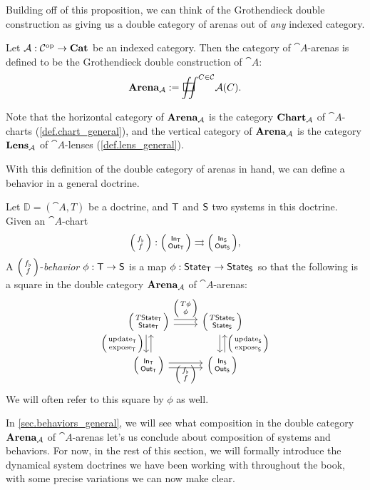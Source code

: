 \documentclass[DynamicalBook]{subfiles}
\begin{document}
Building off of this proposition, we can think of the Grothendieck double
construction as giving us a double category of arenas out of \emph{any} indexed
category.

\begin{definition}\label{def.double_cat_of_arenas_general}
  Let $\mathcal{A} : \mathcal{C}^{\textnormal{op}} \to \textbf{Cat}$ be an indexed category. Then the
  category of $\cat{A}$-arenas is defined to be the Grothendieck double
  construction of $\cat{A}$:
$$\Cat{Arena}_{\cat{A}} := \sqiint^{C \in \cat{C}} \cat{A}(C).$$

  Note that the horizontal category of $\textbf{Arena}_{\mathcal{A}}$ is the category
  $\textbf{Chart}_{\mathcal{A}}$ of $\cat{A}$-charts (\cref{def.chart_general}), and the vertical category of
  $\textbf{Arena}_{\mathcal{A}}$ is the category $\textbf{Lens}_{\mathcal{A}}$ of
  $\cat{A}$-lenses (\cref{def.lens_general}).
\end{definition}

With this definition of the double category of arenas in hand, we can define a
behavior in a general doctrine.
\begin{definition}
 Let $\mathbb{D} = (\cat{A}, T)$ be a doctrine, and $\mathsf{T}$ and $\mathsf{S}$ two
 systems in this doctrine. Given an $\cat{A}$-chart
 \[
\lens{f_{\flat}}{f} : \lens{\In{T}}{\Out{T}} \rightrightarrows \lens{\In{S}}{\Out{S}},
 \]
 A $\lens{f_{\flat}}{f}$-\emph{behavior} $\phi : \mathsf{T} \to \mathsf{S}$
 is a map $\phi : \mathsf{State}_{\mathsf{T}} \to \mathsf{State}_{\mathsf{S}}$ so that the following is a square in
 the double category $\textbf{Arena}_{\mathcal{A}}$ of $\cat{A}$-arenas:
 \[
    \begin{tikzcd}
      \lens{T\State{T}}{\State{T}} \ar[r, shift left, "\lens{T\phi}{\phi}"] \ar[r, shift right] \ar[d, shift right,
      "\lens{\update{T}}{\expose{T}}"'] \ar[d, shift left, leftarrow] &
      \lens{T\State{S}}{\State{S}} \ar[d, shift left, leftarrow,
      "\lens{\update{S}}{\expose{S}}"] \ar[d, shift right]\\
      \lens{\In{T}}{\Out{T}} \ar[r, shift right] \ar[r,
      shift left, "\lens{f_{\flat}}{f}"'] & \lens{\In{S}}{\Out{S}}
    \end{tikzcd}
 \]
 We will often refer to this square by $\phi$ as well.
\end{definition}

In \cref{sec.behaviors_general}, we will see what composition in the double
category $\textbf{Arena}_{\mathcal{A}}$ of $\cat{A}$-arenas let's us conclude about
composition of systems and behaviors. For now, in the rest of this section, we will formally introduce the dynamical system
doctrines we have been working with throughout the book, with some precise
variations we can now make clear.
\end{document}
